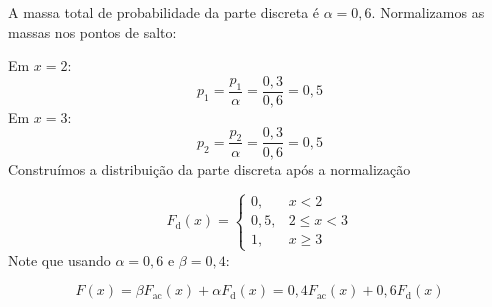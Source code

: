 \begin{frame}
A massa total de probabilidade  da parte discreta é \( \alpha = 0{,}6 \). Normalizamos as massas nos pontos de salto:

\bigskip
Em \( x = 2 \):
\[
p_1 = \dfrac{p_1}{\alpha} = \dfrac{0{,}3}{0{,}6} = 0{,}5
\]
Em \( x = 3 \):
\[
p_2 = \dfrac{p_2}{\alpha} = \dfrac{0{,}3}{0{,}6} = 0{,}5
\]	
 Construímos a distribuição da parte discreta após a normalização

\[
F_{\text{d}}(x) = \begin{cases}
	0, & x < 2 \\
	0{,}5, & 2 \leq x < 3 \\
	1, & x \geq 3
\end{cases}
\]	
Note que usando \( \alpha = 0{,}6 \) e \( \beta = 0{,}4 \):

\[
F(x) = \beta F_{\text{ac}}(x) + \alpha F_{\text{d}}(x) = 0{,}4 F_{\text{ac}}(x) + 0{,}6 F_{\text{d}}(x)
\]

\end{frame}	

